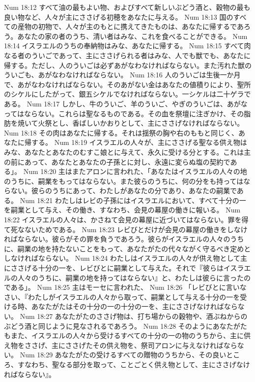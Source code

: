 Num 18:12  すべて油の最もよい物、およびすべて新しいぶどう酒と、穀物の最も良い物など、人々が主にささげる初穂をあなたに与える。
Num 18:13  国のすべての産物の初物で、人々が主のもとに携えてきたものは、あなたに帰するであろう。あなたの家の者のうち、清い者はみな、これを食べることができる。
Num 18:14  イスラエルのうちの奉納物はみな、あなたに帰する。
Num 18:15  すべて肉なる者のういごであって、主にささげられる者はみな、人でも獣でも、あなたに帰する。ただし、人のういごは必ずあがなわなければならない。また汚れた獣のういごも、あがなわなければならない。
Num 18:16  人のういごは生後一か月で、あがなわなければならない。そのあがない金はあなたの値積りにより、聖所のシケルにしたがって、銀五シケルでなければならない。一シケルは二十ゲラである。
Num 18:17  しかし、牛のういご、羊のういご、やぎのういごは、あがなってはならない。これらは聖なるものである。その血を祭壇に注ぎかけ、その脂肪を焼いて火祭とし、香ばしいかおりとして、主にささげなければならない。
Num 18:18  その肉はあなたに帰する。それは揺祭の胸や右のももと同じく、あなたに帰する。
Num 18:19  イスラエルの人々が、主にささげる聖なる供え物はみな、あなたとあなたのむすこ娘とに与えて、永久に受ける分とする。これは主の前にあって、あなたとあなたの子孫とに対し、永遠に変らぬ塩の契約である」。
Num 18:20  主はまたアロンに言われた、「あなたはイスラエルの人々の地のうちに、嗣業をもってはならない。また彼らのうちに、何の分をも持ってはならない。彼らのうちにあって、わたしがあなたの分であり、あなたの嗣業である。
Num 18:21  わたしはレビの子孫にはイスラエルにおいて、すべて十分の一を嗣業として与え、その働き、すなわち、会見の幕屋の働きに報いる。
Num 18:22  イスラエルの人々は、かさねて会見の幕屋に近づいてはならない。罪を得て死なないためである。
Num 18:23  レビびとだけが会見の幕屋の働きをしなければならない。彼らがその罪を負うであろう。彼らがイスラエルの人々のうちに、嗣業の地を持たないことをもって、あなたがたの代々ながく守るべき定めとしなければならない。
Num 18:24  わたしはイスラエルの人々が供え物として主にささげる十分の一を、レビびとに嗣業として与えた。それで『彼らはイスラエルの人々のうちに、嗣業の地を持ってはならない』と、わたしは彼らに言ったのである」。
Num 18:25  主はモーセに言われた、
Num 18:26  「レビびとに言いなさい、『わたしがイスラエルの人々から取って、嗣業として与える十分の一を受ける時、あなたがたはその十分の一の十分の一を、主にささげなければならない。
Num 18:27  あなたがたのささげ物は、打ち場からの穀物や、酒ぶねからのぶどう酒と同じように見なされるであろう。
Num 18:28  そのようにあなたがたもまた、イスラエルの人々から受けるすべての十分の一の物のうちから、主に供え物をささげ、主にささげたその供え物を、祭司アロンに与えなければならない。
Num 18:29  あなたがたの受けるすべての贈物のうちから、その良いところ、すなわち、聖なる部分を取って、ことごとく供え物として、主にささげなければならない』。
